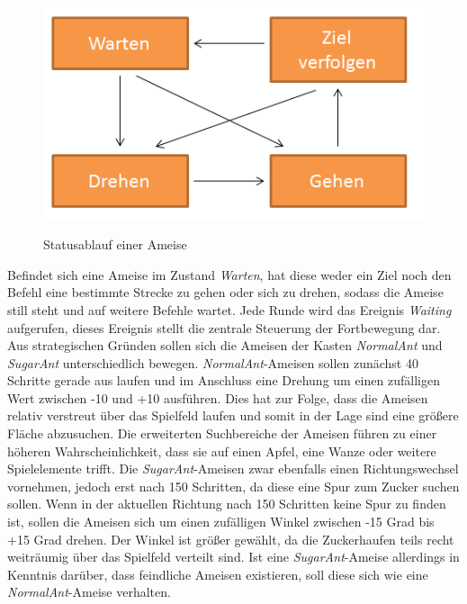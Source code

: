 \begin{figure}[hbt]
\centering
\begin{minipage}[t]{0.5\textwidth} %
\caption{Statusablauf einer Ameise} %
\includegraphics[width=1\textwidth]{img/AntStates.png}\\ %
\label{img:states}
\end{minipage}
\end{figure}


Befindet sich eine Ameise im Zustand \textit{Warten}, hat diese weder ein Ziel noch den Befehl eine bestimmte Strecke zu gehen oder sich zu drehen, sodass die Ameise still steht und auf weitere Befehle wartet. Jede Runde wird das Ereignis \textit{Waiting} aufgerufen, dieses Ereignis stellt die zentrale Steuerung der Fortbewegung dar. Aus strategischen Gründen sollen sich die Ameisen der Kasten \textit{NormalAnt} und \textit{SugarAnt} unterschiedlich bewegen. \textit{NormalAnt}-Ameisen sollen zunächst 40 Schritte gerade aus laufen und im Anschluss eine Drehung um einen zufälligen Wert zwischen -10 und +10 ausführen. Dies hat zur Folge, dass die Ameisen relativ verstreut über das Spielfeld laufen und somit in der Lage sind eine größere Fläche abzusuchen. Die erweiterten Suchbereiche der Ameisen führen zu einer höheren Wahrscheinlichkeit, dass sie auf einen Apfel, eine Wanze oder weitere Spielelemente trifft. Die \textit{SugarAnt}-Ameisen zwar ebenfalls einen Richtungswechsel vornehmen, jedoch erst nach 150 Schritten, da diese eine Spur zum Zucker suchen sollen. Wenn in der aktuellen Richtung nach 150 Schritten keine Spur zu finden ist, sollen die Ameisen sich um einen zufälligen Winkel zwischen -15 Grad bis +15 Grad drehen. Der Winkel ist größer gewählt, da die Zuckerhaufen teils recht weiträumig über das Spielfeld verteilt sind. Ist eine \textit{SugarAnt}-Ameise allerdings in Kenntnis darüber, dass feindliche Ameisen existieren, soll diese sich wie eine \textit{NormalAnt}-Ameise verhalten.

